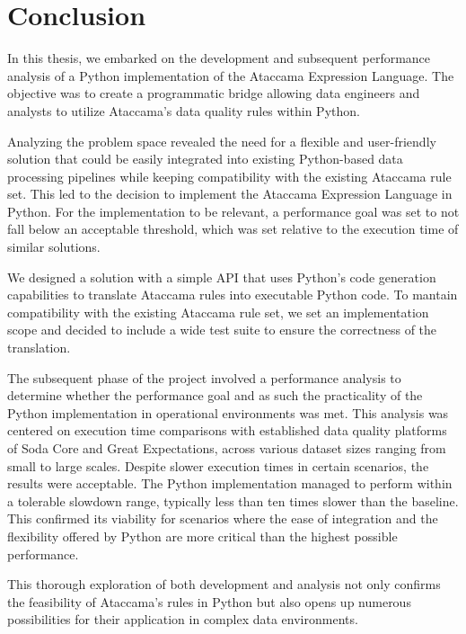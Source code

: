 \chapter*{Conclusion}

In this thesis, we embarked on the development and subsequent performance analysis of a Python implementation of the Ataccama Expression Language. The objective was to create a programmatic bridge allowing data engineers and analysts to utilize Ataccama's data quality rules within Python. 

Analyzing the problem space revealed the need for a flexible and user-friendly solution that could be easily integrated into existing Python-based data processing pipelines while keeping compatibility with the existing Ataccama rule set. This led to the decision to implement the Ataccama Expression Language in Python. For the implementation to be relevant, a performance goal was set to not fall below an acceptable threshold, which was set relative to the execution time of similar solutions.

We designed a solution with a simple API that uses Python's code generation capabilities to translate Ataccama rules into executable Python code. To mantain compatibility with the existing Ataccama rule set, we set an implementation scope and decided to include a wide test suite to ensure the correctness of the translation. 

The subsequent phase of the project involved a performance analysis to determine whether the performance goal and as such the practicality of the Python implementation in operational environments was met. This analysis was centered on execution time comparisons with established data quality platforms of Soda Core and Great Expectations, across various dataset sizes ranging from small to large scales. Despite slower execution times in certain scenarios, the results were acceptable. The Python implementation managed to perform within a tolerable slowdown range, typically less than ten times slower than the baseline. This confirmed its viability for scenarios where the ease of integration and the flexibility offered by Python are more critical than the highest possible performance.

This thorough exploration of both development and analysis not only confirms the feasibility of Ataccama's rules in Python but also opens up numerous possibilities for their application in complex data environments.